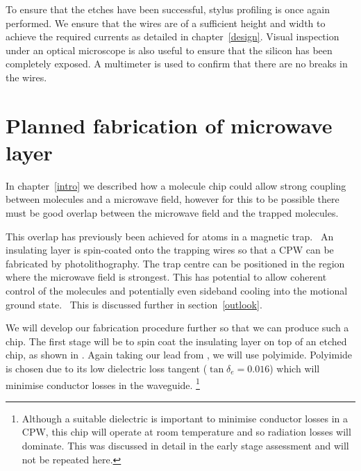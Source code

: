 {To ensure that the etches have been successful, stylus profiling is once again
performed. We ensure that the wires are of a sufficient height and width to
achieve the required currents as detailed in chapter~\ref{design}. Visual
inspection under an optical microscope is also useful to ensure that the
silicon has been completely exposed. A multimeter is used to confirm that there
are no breaks in the wires.



\begin{figure}
\centering
  \caption{}
  \label{fab:fig:protoype}
\end{figure}

\section{Planned fabrication of microwave layer}
\label{fab:planned}

In chapter~\ref{intro} 
we described how a molecule chip could allow strong coupling between \CaF{}
molecules and a microwave field, however for this to be possible there must be
good overlap between the microwave field and the trapped
molecules.~\cite{Andre2006} 

This overlap has previously been achieved for atoms in a magnetic
trap.~\cite{Treutlein2008} An insulating layer is spin-coated onto the trapping
wires so that a CPW  can be fabricated by
photolithography. The trap centre can be positioned in the region where the
microwave field is strongest. This has potential to allow coherent control of
the molecules and potentially even sideband cooling into the motional ground
state.~\cite{Andre2006} This is discussed further in section~\ref{outlook}.

We will develop our fabrication procedure further so that we can produce such a
chip. The first stage will be to spin coat the insulating layer on top of an
etched chip, as shown in . Again taking our lead
from , we will use polyimide. Polyimide is chosen due
to its low dielectric loss tangent ($\tan\delta_e = 0.016$) which will minimise
conductor losses in the waveguide.  \footnote{Although a suitable dielectric is
important to minimise conductor losses in a CPW, this chip will operate at room
temperature and so radiation losses will dominate. This was discussed in detail
in the early stage assessment and will not be repeated here.}~\cite{Collin2007,
Simons2004}
%

}
